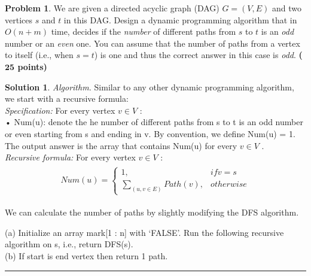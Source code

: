 \documentclass{article}
\theoremstyle{definition}
\newtheorem{problem}{Problem}
\def\fline{\rule{0.75\linewidth}{0.5pt}}
\newcommand{\finishline}{\begin{center}\fline\end{center}}
\newtheorem*{solution*}{Solution}
\newenvironment{solution}{\begin{solution*}}{{\finishline} \end{solution*}}
\newcommand{\grade}[1]{\hfill{\textbf{($\mathbf{#1}$ points)}}}
\begin{document}
\medskip

\begin{problem}
	We are given a directed acyclic graph (DAG) $G=(V,E)$ and two vertices $s$ and $t$ in this DAG. Design a dynamic programming algorithm that in $O(n+m)$ time, decides if the \emph{number} of different paths from $s$ to $t$ is an \emph{odd} number or an \emph{even} one. You can assume that the number of paths from a vertex to itself (i.e., when $s=t$) is one and thus the correct answer in this case is \emph{odd}. \grade{25}

\end{problem}

\bigskip

\begin{solution}

	\emph{Algorithm.} Similar to any other dynamic programming algorithm, we start with a recursive formula:  \\
	
	\emph{Specification:} For every vertex $v \in V$ : \\
	
	• Num(u): denote the he number of different paths from s to t is an odd number or even starting from s and ending in v. By convention, we define Num(u) = 1. \\
	
	The output answer is the array that contains Num(u) for every $v \in V$ . \\
	
	\emph{Recursive formula:} For every vertex $v \in V$ : \\ 
	
	\begin{align*}
 		\begin{split}
 			Num(u)= \left \{
 			\begin{array}{ll}
 				1,                      					& if  v = s \\
 				\sum_{(u,v \in E)} Path(v),              	& otherwise
 			\end{array}
		\right.
 		\end{split}
	\end{align*}
	
	We can calculate the number of paths by slightly modifying the DFS algorithm. 
	
	(a) Initialize an array mark[1 : n] with ‘FALSE’. Run the following recursive algorithm on s, i.e., return DFS(s). \\
	
	(b) If start is end vertex then return 1 path. \\
	

\end{solution}
\end{document}
